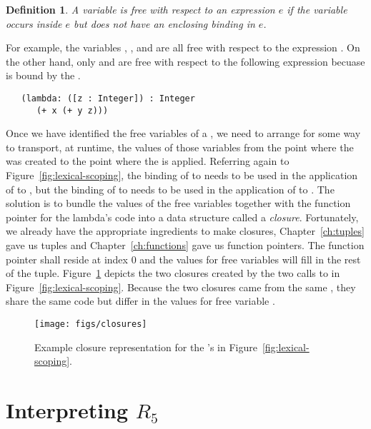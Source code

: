 \documentclass[11pt]{book}
\newtheorem{definition}[theorem]{Definition}
\begin{document}
\begin{definition}
A variable is \emph{free with respect to an expression} $e$ if the
variable occurs inside $e$ but does not have an enclosing binding in
$e$.
\end{definition}

For example, the variables , , and  are all
free with respect to the expression .  On the
other hand, only  and  are free with respect to the
following expression becuase  is bound by the .
\begin{lstlisting}
   (lambda: ([z : Integer]) : Integer
      (+ x (+ y z)))
\end{lstlisting}

Once we have identified the free variables of a , we need
to arrange for some way to transport, at runtime, the values of those
variables from the point where the  was created to the
point where the  is applied. Referring again to
Figure~\ref{fig:lexical-scoping}, the binding of  to 
needs to be used in the application of  to , but the
binding of  to  needs to be used in the application of
 to . The solution is to bundle the values of the
free variables together with the function pointer for the lambda's
code into a data structure called a \emph{closure}. Fortunately, we
already have the appropriate ingredients to make closures,
Chapter~\ref{ch:tuples} gave us tuples and Chapter~\ref{ch:functions}
gave us function pointers. The function pointer shall reside at index
$0$ and the values for free variables will fill in the rest of the
tuple. Figure~\ref{fig:closures} depicts the two closures created by
the two calls to  in Figure~\ref{fig:lexical-scoping}.
Because the two closures came from the same , they share
the same code but differ in the values for free variable .

\begin{figure}[tbp]
\centering \texttt{[image: figs/closures]}
\caption{Example closure representation for the 's
  in Figure~\ref{fig:lexical-scoping}.}
\label{fig:closures}
\end{figure}


\section{Interpreting $R_5$}
\end{document}
